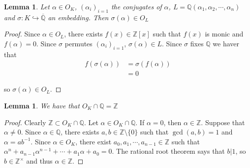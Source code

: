 \documentclass[12pt]{amsart}
\newtheorem{lem}[thm]{Lemma}
\theoremstyle{definition}
\theoremstyle{remark}
\theoremstyle{definition}
\newcommand{\al}{\alpha}
\newcommand{\sig}{\sigma}
\newcommand{\Z}{\mathbb{Z}}
\newcommand{\Q}{\mathbb{Q}}
\begin{document}
\begin{lem}
Let $\al \in O_K$, $(\al_i)_{i=1}$ the conjugates of $\al$, $L = \Q(\al_1, \al_2, \cdots, \al_n)$ and $\sig: K \hookrightarrow \overline{\Q}$ an embedding. Then $\sig(\al) \in O_L$
\end{lem}

\begin{proof}
Since $\al \in O_L$, there exists $f(x) \in \Z[x]$ such that $f(x)$ is monic and $f(\al)=0$. Since $\sig$ permutes $(\al_i)_{i=1}$, $\sig(\al) \in L$. Since $\sig$ fixes $\Q$ we haver that
\begin{align*}
f(\sig(\al)) 
&= \sig(f(\al))\\
&=0
\end{align*}

so $\sig(\al) \in O_L$.
\end{proof}

\begin{lem}
We have that $O_K \cap \Q = \Z$
\end{lem}

\begin{proof}
Clearly $\Z \subset O_K \cap \Q$. Let $\al \in O_K \cap \Q$. If $\al=0$, then $\al \in \Z$. Suppose that $\al \neq 0$. Since $\al \in \Q$, there exists $a,b \in \Z\setminus\{0\}$ such that $\gcd(a,b) =1$ and $\al = ab^{-1}$. Since $\al \in O_K$, there exist $a_0, a_1, \cdots, a_{n-1} \in \Z$ such that $\al^n + a_{n-1}\al^{n-1} + \cdots + a_1\al + a_0=0$. The rational root theorem says that $b|1$, so $b\in \Z^{\times}$ and thus $\al \in \Z$.
\end{proof}
\end{document}
